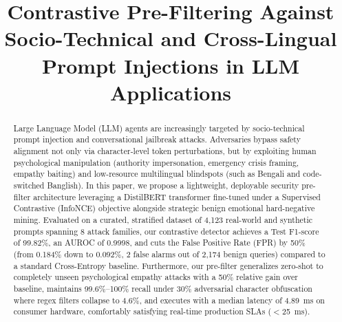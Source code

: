 \documentclass[conference]{IEEEtran}
\begin{document}
\title{Contrastive Pre-Filtering Against Socio-Technical and Cross-Lingual Prompt Injections in LLM Applications}

\author{
\and
{}
}

\maketitle

\begin{abstract}
Large Language Model (LLM) agents are increasingly targeted by socio-technical prompt injection and conversational jailbreak attacks. Adversaries bypass safety alignment not only via character-level token perturbations, but by exploiting human psychological manipulation (authority impersonation, emergency crisis framing, empathy baiting) and low-resource multilingual blindspots (such as Bengali and code-switched Banglish). In this paper, we propose a lightweight, deployable security pre-filter architecture leveraging a DistilBERT transformer fine-tuned under a Supervised Contrastive (InfoNCE) objective alongside strategic benign emotional hard-negative mining. Evaluated on a curated, stratified dataset of 4,123 real-world and synthetic prompts spanning 8 attack families, our contrastive detector achieves a Test F1-score of 99.82\%, an AUROC of 0.9998, and cuts the False Positive Rate (FPR) by 50\% (from 0.184\% down to 0.092\%, 2 false alarms out of 2,174 benign queries) compared to a standard Cross-Entropy baseline. Furthermore, our pre-filter generalizes zero-shot to completely unseen psychological empathy attacks with a 50\% relative gain over baseline, maintains 99.6\%--100\% recall under 30\% adversarial character obfuscation where regex filters collapse to 4.6\%, and executes with a median latency of 4.89~ms on consumer hardware, comfortably satisfying real-time production SLAs ($<$25~ms).
\end{abstract}
\end{document}
